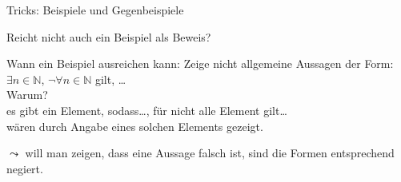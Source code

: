 \begin{frame}[fragile]{Tricks: Beispiele und Gegenbeispiele}
    \begin{alertblock}{Reicht nicht auch ein Beispiel als Beweis?}
    \end{alertblock}
    \begin{block}{Wann ein Beispiel ausreichen kann:}
        Zeige nicht allgemeine Aussagen der Form:\\
        $\exists n\in\mathbb{N}$, $\neg\forall n\in\mathbb{N}$ gilt, \dots\\
        \alert{Warum?}\\
        \glqq es gibt ein Element, sodass\dots\grqq, \glqq für nicht alle Element gilt\dots\grqq\\wären durch Angabe eines solchen Elements gezeigt.
    \end{block}
        $\leadsto$ will man zeigen, dass eine Aussage falsch ist, sind die Formen entsprechend negiert.
\end{frame}
